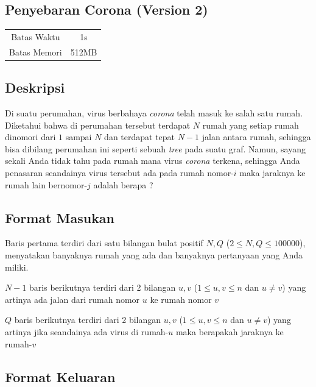 \documentclass{article}
\begin{document}
\begin{center}
    \section*{Penyebaran Corona (Version 2)} %

    \begin{tabular}{ | c c | }
        \hline
        Batas Waktu  & 1s \\    %
        Batas Memori & 512MB \\  %
        \hline
    \end{tabular}
\end{center}

\subsection*{Deskripsi}

Di suatu perumahan, virus berbahaya \textit{corona} telah masuk ke salah satu rumah. Diketahui bahwa di perumahan tersebut terdapat $N$ rumah yang setiap rumah dinomori dari $1$ sampai $N$ dan terdapat tepat $N - 1$ jalan antara rumah, sehingga bisa dibilang perumahan ini seperti sebuah \textit{tree} pada suatu graf. Namun, sayang sekali Anda tidak tahu pada rumah mana virus \textit{corona} terkena, sehingga Anda penasaran seandainya virus tersebut ada pada rumah nomor-$i$ maka jaraknya ke rumah lain bernomor-$j$ adalah berapa ?

\subsection*{Format Masukan}

Baris pertama terdiri dari satu bilangan bulat positif $N, Q$ ($2 \leq N, Q \leq 100000$), menyatakan banyaknya rumah yang ada dan banyaknya pertanyaan yang Anda miliki.

$N-1$ baris berikutnya terdiri dari 2 bilangan $u, v$ ($1 \leq u, v \leq n$ dan $u \neq v$) yang artinya ada jalan dari rumah nomor $u$ ke rumah nomor $v$

$Q$ baris berikutnya terdiri dari 2 bilangan $u, v$ ($1 \leq u, v \leq n$ dan $u \neq v$) yang artinya jika seandainya ada virus di rumah-$u$ maka berapakah jaraknya ke rumah-$v$

\subsection*{Format Keluaran}
\end{document}
